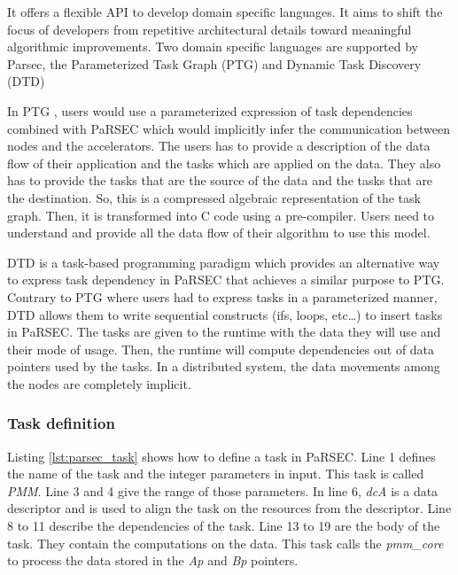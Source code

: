 It offers a flexible API to develop domain specific languages.
It aims to shift the focus of developers from repetitive architectural details toward meaningful algorithmic improvements.
Two domain specific languages are supported by Parsec, the Parameterized Task Graph \cite{DBBHD2014} (PTG) and Dynamic Task Discovery \cite{HoHBD2017} (DTD)

In PTG \cite{DBBHD2014}, users would use a parameterized expression of task dependencies combined with PaRSEC which would implicitly infer the communication between nodes and the accelerators.
The users has to provide a description of the data flow of their application and the tasks which are applied on the data.
They also has to provide the tasks that are the source of the data and the tasks that are the destination.
So, this is a compressed algebraic representation of the task graph.
Then, it is transformed into C code using a pre-compiler.
Users need to understand and provide all the data flow of their algorithm to use this model.


DTD \cite{HoHBD2017} is a task-based programming paradigm which provides an alternative way to express task dependency in PaRSEC that achieves a similar purpose to PTG.
Contrary to PTG where users had to express tasks in a parameterized manner, DTD allows them to write sequential constructs (ifs, loops, etc\dots) to insert tasks in PaRSEC.
The tasks are given to the runtime with the data they will use and their mode of usage.
Then, the runtime will compute dependencies out of data pointers used by the tasks.
In a distributed system, the data movements among the nodes are completely implicit.


\begin{figure}

\end{figure}


\subsubsection{Task definition}
Listing \ref{lst:parsec_task} shows how to define a task in PaRSEC.
Line 1 defines the name of the task and the integer parameters in input.
This task is called \textit{PMM}.
Line 3 and 4 give the range of those parameters.
In line 6, \textit{dcA} is a data descriptor and is used to align the task on the resources from the descriptor.
Line 8 to 11 describe the dependencies of the task.
Line 13 to 19 are the body of the task.
They contain the computations on the data.
This task calls the \textit{pmm\_core} to process the data stored in the \textit{Ap} and \textit{Bp} pointers.


